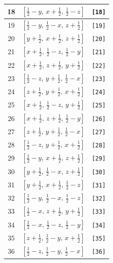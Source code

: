 \documentclass[fleqn,8pt]{jsarticle}
\begin{document}
\begin{longtable}{ccc}
18 & $\left[ \frac{1}{2} - y,\, x + \frac{1}{2},\, \frac{1}{2} - z \right]$ & {\tt [18]} \\ \hline
19 & $\left[ \frac{1}{2} - y,\, \frac{1}{2} - x,\, z + \frac{1}{2} \right]$ & {\tt [19]} \\ \hline
20 & $\left[ y + \frac{1}{2},\, x + \frac{1}{2},\, z + \frac{1}{2} \right]$ & {\tt [20]} \\ \hline
21 & $\left[ x + \frac{1}{2},\, \frac{1}{2} - z,\, \frac{1}{2} - y \right]$ & {\tt [21]} \\ \hline
22 & $\left[ x + \frac{1}{2},\, z + \frac{1}{2},\, y + \frac{1}{2} \right]$ & {\tt [22]} \\ \hline
23 & $\left[ \frac{1}{2} - z,\, y + \frac{1}{2},\, \frac{1}{2} - x \right]$ & {\tt [23]} \\ \hline
24 & $\left[ z + \frac{1}{2},\, y + \frac{1}{2},\, x + \frac{1}{2} \right]$ & {\tt [24]} \\ \hline
25 & $\left[ x + \frac{1}{2},\, \frac{1}{2} - z,\, y + \frac{1}{2} \right]$ & {\tt [25]} \\ \hline
26 & $\left[ x + \frac{1}{2},\, z + \frac{1}{2},\, \frac{1}{2} - y \right]$ & {\tt [26]} \\ \hline
27 & $\left[ z + \frac{1}{2},\, y + \frac{1}{2},\, \frac{1}{2} - x \right]$ & {\tt [27]} \\ \hline
28 & $\left[ \frac{1}{2} - z,\, y + \frac{1}{2},\, x + \frac{1}{2} \right]$ & {\tt [28]} \\ \hline
29 & $\left[ \frac{1}{2} - y,\, x + \frac{1}{2},\, z + \frac{1}{2} \right]$ & {\tt [29]} \\ \hline
30 & $\left[ y + \frac{1}{2},\, \frac{1}{2} - x,\, z + \frac{1}{2} \right]$ & {\tt [30]} \\ \hline
31 & $\left[ y + \frac{1}{2},\, x + \frac{1}{2},\, \frac{1}{2} - z \right]$ & {\tt [31]} \\ \hline
32 & $\left[ \frac{1}{2} - y,\, \frac{1}{2} - x,\, \frac{1}{2} - z \right]$ & {\tt [32]} \\ \hline
33 & $\left[ \frac{1}{2} - x,\, z + \frac{1}{2},\, y + \frac{1}{2} \right]$ & {\tt [33]} \\ \hline
34 & $\left[ \frac{1}{2} - x,\, \frac{1}{2} - z,\, \frac{1}{2} - y \right]$ & {\tt [34]} \\ \hline
35 & $\left[ z + \frac{1}{2},\, \frac{1}{2} - y,\, x + \frac{1}{2} \right]$ & {\tt [35]} \\ \hline
36 & $\left[ \frac{1}{2} - z,\, \frac{1}{2} - y,\, \frac{1}{2} - x \right]$ & {\tt [36]} \\ \hline

\end{longtable}
\end{document}
